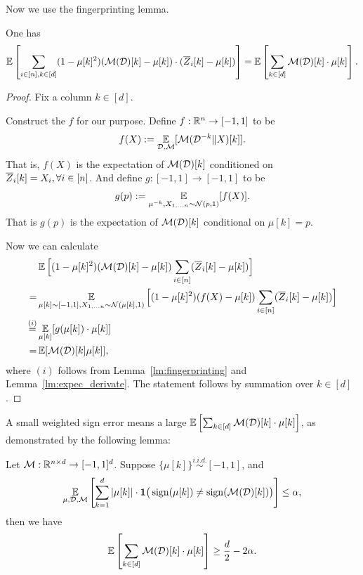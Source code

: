 Now we use the fingerprinting lemma.
\begin{lemma}
One has
\begin{align*}
    \operatorname*{\mathbb{E}}\left[\sum_{i\in[n],k\in[d]} (1-\mu[k]^2) (\mathcal{M}(\mathcal{D})[k]-\mu[k])\cdot(\overline{Z}_i[k]-\mu[k])\right]= \operatorname*{\mathbb{E}}\left[ \sum_{k\in[d]}\mathcal{M}(\mathcal{D})[k]\cdot\mu[k] \right].
\end{align*}

\end{lemma}
\begin{proof}
 Fix a column $k\in[d]$.
 
Construct the $f$ for our purpose. 
Define $f:\mathbb{R}^n\to [-1,1]$ to be 
\begin{align*}
    f(X):=\operatorname*{\mathbb{E}}_{\mathcal{D},\mathcal{M}}[\mathcal{M}(\mathcal{D}^{-k}\| X)[k]].
\end{align*}
That is, $f(X)$ is the expectation of $\mathcal{M}(\mathcal{D})[k]$ conditioned on $\overline{Z}_i[k]=X_i,\forall i\in[n]$.
And define $g:[-1,1]\to[-1,1]$ to be
\begin{align*}
    g(p):=\operatorname*{\mathbb{E}}_{\mu^{-k},X_{1,\ldots n}\sim \mathcal{N}(p,1)}[f(X)].
\end{align*}
That is $g(p)$ is the expectation of $\mathcal{M}(\mathcal{D})[k]$ conditional on $\mu[k]=p$.

Now we can calculate
\begin{align*}
    &\operatorname*{\mathbb{E}}\Big[(1-\mu[k]^2)(\mathcal{M}(\mathcal{D})[k]-\mu[k])\sum_{i\in[n]}(\overline{Z}_i[k]-\mu[k])\Big]\\
    =& \operatorname*{\mathbb{E}}_{\mu[k]\sim[-1,1],X_{1,\ldots n}\sim\mathcal{N}(\mu[k],1)}\Big[ (1-\mu[k]^2) (f(X)-\mu[k])\sum_{i\in[n]}(\overline{Z}_i[k]-\mu[k])   \Big] \\
    \stackrel{(i)}{=}& \operatorname*{\mathbb{E}}_{\mu[k]} [g(\mu[k])\cdot \mu[k]]\\
    =& \operatorname*{\mathbb{E}}[\mathcal{M}(\mathcal{D})[k]\mu[k]],
\end{align*}
where $(i)$ follows from Lemma~\ref{lm:fingerprinting} and Lemma~\ref{lm:expec_derivate}.
The statement follows by summation over $k\in[d]$.
 \end{proof}


A small weighted sign error means a large $\operatorname*{\mathbb{E}}\left[ \sum_{k\in[d]}\mathcal{M}(\mathcal{D})[k]\cdot\mu[k] \right]$, as demonstrated by the following lemma:

\begin{lemma}
Let $\mathcal{M}:\mathbb{R}^{n\times d}\to [-1,1]^d$.
    Suppose $\{\mu[k]\}\stackrel{i.i.d.}{\sim}[-1,1]$, and
    \begin{align*}
        \operatorname*{\mathbb{E}}_{\mu,\mathcal{D},\mathcal{M}}\left[\sum_{k=1}^{d} |\mu[k]|\cdot \mathbf{1}\big(\operatorname{sign}(\mu[k])\neq\operatorname{sign}(\mathcal{M}(\mathcal{D})[k])\big)\right]\le \alpha,
    \end{align*}
    then we have 
    \begin{align*}
        \operatorname*{\mathbb{E}}\left[ \sum_{k\in[d]}\mathcal{M}(\mathcal{D})[k]\cdot\mu[k] \right]\ge \frac{d}{2}-2\alpha.
    \end{align*}
\end{lemma}

